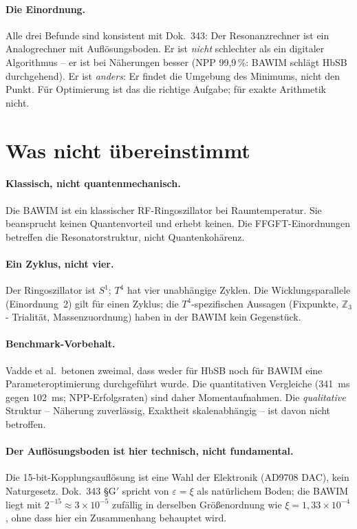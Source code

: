 \paragraph{Die Einordnung.} Alle drei Befunde sind konsistent mit
Dok.~343: Der Resonanzrechner ist ein Analogrechner mit Auflösungsboden.
Er ist \emph{nicht} schlechter als ein digitaler Algorithmus -- er ist bei
Näherungen besser (NPP 99,9\,\%: BAWIM schlägt HbSB durchgehend). Er ist
\emph{anders}: Er findet die Umgebung des Minimums, nicht den Punkt. Für
Optimierung ist das die richtige Aufgabe; für exakte Arithmetik nicht. \SM

\section{Was nicht übereinstimmt}

\paragraph{Klassisch, nicht quantenmechanisch.} Die BAWIM ist ein
klassischer RF-Ringoszillator bei Raumtemperatur. Sie beansprucht keinen
Quantenvorteil und erhebt keinen. Die FFGFT-Einordnungen betreffen die
Resonatorstruktur, nicht Quantenkohärenz.

\paragraph{Ein Zyklus, nicht vier.} Der Ringoszillator ist $S^1$; $T^4$
hat vier unabhängige Zyklen. Die Wicklungsparallele (Einordnung~2) gilt für
einen Zyklus; die $T^4$-spezifischen Aussagen (Fixpunkte, $\mathbb{Z}_3$-%
Trialität, Massenzuordnung) haben in der BAWIM kein Gegenstück.

\paragraph{Benchmark-Vorbehalt.} Vadde et al.\ betonen zweimal, dass
weder für HbSB noch für BAWIM eine Parameteroptimierung durchgeführt
wurde. Die quantitativen Vergleiche (341~ms gegen 102~ms; NPP-Erfolgsraten)
sind daher Momentaufnahmen. Die \emph{qualitative} Struktur -- Näherung
zuverlässig, Exaktheit skalenabhängig -- ist davon nicht betroffen.

\paragraph{Der Auflösungsboden ist hier technisch, nicht fundamental.}
Die 15-bit-Kopplungsauflösung ist eine Wahl der Elektronik (AD9708 DAC),
kein Naturgesetz. Dok.~343 §G$'$ spricht von $\varepsilon=\xi$ als
natürlichem Boden; die BAWIM liegt mit $2^{-15}\approx3\times10^{-5}$
zufällig in derselben Größenordnung wie $\xi=1{,}33\times10^{-4}$, ohne
dass hier ein Zusammenhang behauptet wird.

